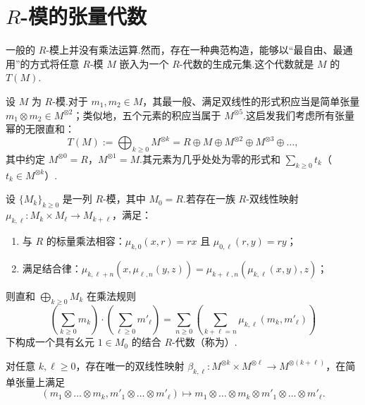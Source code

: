 \section{\texorpdfstring{$R$}{R}-模的张量代数}
\label{sec:tensor-algebra}

一般的 $R$-模上并没有乘法运算.然而，存在一种典范构造，能够以``最自由、最通用''的方式将任意 $R$-模 $M$ 嵌入为一个 $R$-代数的生成元集.这个代数就是 $M$ 的 $T(M)$.

设 $M$ 为 $R$-模.对于 $m_1, m_2 \in M$，其最一般、满足双线性的形式积应当是简单张量 $m_1 \otimes m_2 \in M^{\otimes 2}$；类似地，五个元素的积应当属于 $M^{\otimes 5}$.这启发我们考虑所有张量幂的无限直和：
\begin{equation}
  T(M) := \bigoplus_{k \geq 0} M^{\otimes k} = R \oplus M \oplus M^{\otimes 2} \oplus M^{\otimes 3} \oplus \dots,
\end{equation}
其中约定 $M^{\otimes 0} = R$，$M^{\otimes 1} = M$.其元素为几乎处处为零的形式和 $\sum_{k \geq 0} t_k$（$t_k \in M^{\otimes k}$）.

\begin{theorem}[分次代数构造定理]\label{thm:graded-algebra-construction}
设 $\{M_k\}_{k \geq 0}$ 是一列 $R$-模，其中 $M_0 = R$.若存在一族 $R$-双线性映射 $\mu_{k, \ell} \colon M_k \times M_\ell \to M_{k+\ell}$，满足：
\begin{enumerate}
  \item 与 $R$ 的标量乘法相容：$\mu_{k, 0}(x, r) = rx$ 且 $\mu_{0, \ell}(r, y) = ry$；
  \item 满足结合律：$\mu_{k, \ell+n}(x, \mu_{\ell, n}(y, z)) = \mu_{k+\ell, n}(\mu_{k, \ell}(x, y), z)$；
\end{enumerate}
则直和 $\bigoplus_{k \geq 0} M_k$ 在乘法规则
\begin{equation}
  \left(\sum_{k \geq 0} m_k\right) \cdot \left(\sum_{\ell \geq 0} m'_\ell\right) = \sum_{n \geq 0} \left(\sum_{k+\ell=n} \mu_{k, \ell}(m_k, m'_\ell)\right)
\end{equation}
下构成一个具有幺元 $1 \in M_0$ 的结合 $R$-代数（称为）.
\end{theorem}

\begin{lemma}\label{lem:tensor-power-bilinear}
对任意 $k, \ell \geq 0$，存在唯一的双线性映射 $\beta_{k, \ell} \colon M^{\otimes k} \times M^{\otimes \ell} \to M^{\otimes (k+\ell)}$，在简单张量上满足
\[
  (m_1 \otimes \dots \otimes m_k, m'_1 \otimes \dots \otimes m'_\ell) \mapsto m_1 \otimes \dots \otimes m_k \otimes m'_1 \otimes \dots \otimes m'_\ell.
\]
\end{lemma}

